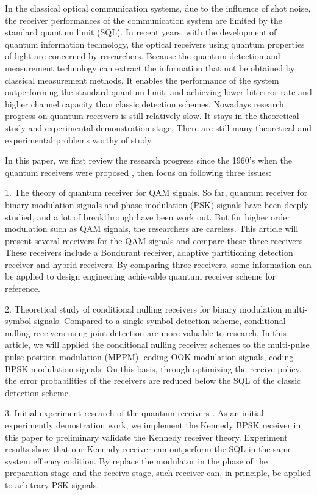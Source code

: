 \begin{enabstract}
In the classical optical communication systems, 
due to the influence of shot noise,
the receiver performances of the communication system  
are limited by the standard quantum limit (SQL).
In recent years, with the development of quantum information technology, 
the optical receivers using quantum properties of light 
are concerned by researchers.
Because the quantum detection and measurement  technology can extract the information 
that not be obtained by classical measurement methods.
It enables the performance of the system outperforming the standard quantum limit,
and achieving lower bit error rate and higher channel capacity than classic detection schemes.
Nowadays research progress on quantum receivers is still relatively slow. 
It stays in the theoretical study and experimental demonstration stage,
There are still many theoretical and experimental problems worthy of study.


In this paper, we first review the research progress since the 1960's when the quantum receivers were proposed ,
then focus on following three issues:


1. The theory of quantum receiver for QAM signals.
So far, quantum receiver for binary modulation signals and phase modulation (PSK) signals 
have been deeply studied, and a lot of breakthrough have been work out.
But for higher order modulation such as QAM signals, the researchers are careless.
This article will present several receivers for the QAM signals and compare these three receivers.
These receivers include a  Bondurant receiver, 
adaptive partitioning detection receiver and hybrid receivers.
By comparing three receivers, some information can be applied to 
design engineering achievable quantum receiver scheme for reference.

2. Theoretical study of conditional nulling receivers for binary modulation multi-symbol signals.
Compared to a single symbol detection scheme, conditional nulling receivers using joint detection  
are more valuable to research. In this article, we will applied the conditional nulling receiver schemes
to the multi-pulse pulse position modulation (MPPM), coding OOK modulation signals,
coding BPSK modulation signals. On this basis, through optimizing the receive policy,
the error probabilities of the receivers are reduced below the SQL of the classic detection scheme.

3. Initial experiment research of  the quantum receivers .
As an initial experimently demostration work, we implement the Kennedy BPSK receiver in this paper 
to preliminary validate the Kennedy receiver theory.
Experiment results show that our Kenendy receiver can outperform the SQL in the same system effiency codition.
By replace the modulator in the phase of the preparation stage and the receive stage,
such receiver can, in principle, be applied to arbitrary PSK signals.

\end{enabstract}
